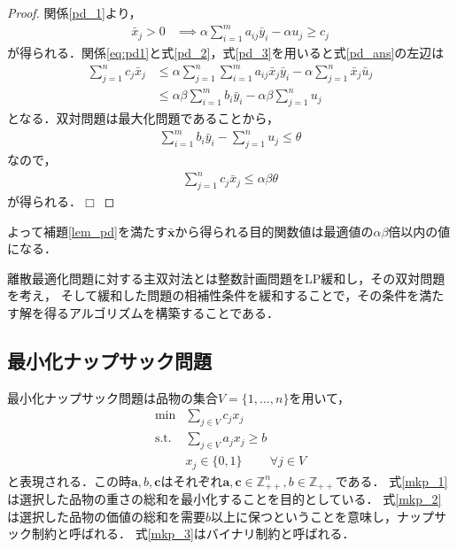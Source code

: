 \documentclass[11pt,dvipdfmx]{jarticle}
\def\qed{\hfill $\Box$}
\numberwithin{equation}{section}
\newtheorem{proof}{証明}
\begin{document}
        \begin{proof}
            関係\eqref{pd_1}より，
            \begin{align}
                \bar{x}_j>0 &\implies \alpha\sum_{i=1}^{m}{a_{ij}\bar{y}_i}-\alpha u_j \ge c_j \label{eq:pd1}
            \end{align}
            が得られる．関係\eqref{eq:pd1}と式\eqref{pd_2}，式\eqref{pd_3}を用いると式\eqref{pd_ans}の左辺は
            \begin{align}
                \sum_{j = 1}^{n}{c_j\bar{x}_j} &\le \alpha\sum_{j=1}^n{\sum_{i=1}^m{a_{ij}\bar{x}_j\bar{y}_i}}-\alpha\sum_{j=1}^{n}{\bar{x}_j\bar{u}_j}\\
                                            &\le \alpha\beta\sum_{i=1}^m{b_i\bar{y}_i}-\alpha\beta\sum_{j=1}^{n}{u_j}\label{pd_pr1}
            \end{align}
            となる．双対問題は最大化問題であることから，
            \begin{align}
                \sum_{i=1}^m{b_i\bar{y}_i}-\sum_{j=1}^{n}{u_j}\le\theta
            \end{align}
            なので， 
            \begin{align}
                \sum_{j = 1}^{n}{c_j\bar{x}_j} \le \alpha\beta\theta
            \end{align}
            が得られる．\qed
        \end{proof}
        よって補題\ref{lem_pd}を満たす$\bar{\bm{x}}$から得られる目的関数値は最適値の$\alpha\beta$倍以内の値になる．\par
        離散最適化問題に対する主双対法とは整数計画問題をLP緩和し，その双対問題を考え，
        そして緩和した問題の相補性条件を緩和することで，その条件を満たす解を得るアルゴリズムを構築することである．\par
    \subsection{最小化ナップサック問題}
        最小化ナップサック問題は品物の集合$V=\{1,\dotsc,n\}$を用いて，
        \begin{subequations}
            \begin{align}
                \mathrm{min } & \sum_{j\in V}{c_jx_j} \label{mkp_1}\\
                \mathrm{s.t.} & \sum_{j\in V}{a_jx_j}\ge b \label{mkp_2}\\
                            & x_j \in \{0,1\}\;\;\;\;\;\;\;\;\forall j\in V \label{mkp_3}
            \end{align}\label{mkp_org}
        \end{subequations}
        と表現される．この時$\bm{a},b,\bm{c}$はそれぞれ$\bm{a},\bm{c}\in\mathbb{Z}^n_{++},b\in\mathbb{Z}_{++}$である．
        式\eqref{mkp_1}は選択した品物の重さの総和を最小化することを目的としている．
        式\eqref{mkp_2}は選択した品物の価値の総和を需要$b$以上に保つということを意味し，ナップサック制約と呼ばれる．
        式\eqref{mkp_3}はバイナリ制約と呼ばれる．
\end{document}
